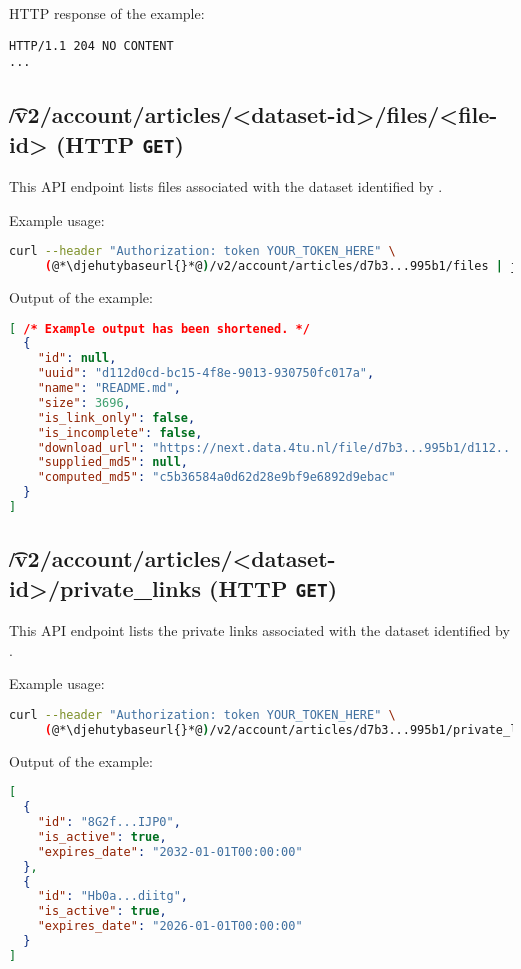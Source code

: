   HTTP response of the example:
\begin{lstlisting}
HTTP/1.1 204 NO CONTENT
...
\end{lstlisting}

\subsection{\t{/v2/account/articles/<dataset-id>/files/<file-id>} (HTTP \texttt{GET})}

  This API endpoint lists files associated with the dataset identified by
  .

  Example usage:
\begin{lstlisting}[language=bash]
curl --header "Authorization: token YOUR_TOKEN_HERE" \
     (@*\djehutybaseurl{}*@)/v2/account/articles/d7b3...995b1/files | jq
\end{lstlisting}

  Output of the example:
\begin{lstlisting}[language=JSON]
[ /* Example output has been shortened. */
  {
    "id": null,
    "uuid": "d112d0cd-bc15-4f8e-9013-930750fc017a",
    "name": "README.md",
    "size": 3696,
    "is_link_only": false,
    "is_incomplete": false,
    "download_url": "https://next.data.4tu.nl/file/d7b3...995b1/d112...c017a",
    "supplied_md5": null,
    "computed_md5": "c5b36584a0d62d28e9bf9e6892d9ebac"
  }
]
\end{lstlisting}

\subsection{\t{/v2/account/articles/<dataset-id>/private\_links} (HTTP \texttt{GET})}

  This API endpoint lists the private links associated with the dataset
  identified by \code{dataset-id}.

  Example usage:
\begin{lstlisting}[language=bash]
curl --header "Authorization: token YOUR_TOKEN_HERE" \
     (@*\djehutybaseurl{}*@)/v2/account/articles/d7b3...995b1/private_links | jq
\end{lstlisting}

  Output of the example:
\begin{lstlisting}[language=JSON]
[
  {
    "id": "8G2f...IJP0",
    "is_active": true,
    "expires_date": "2032-01-01T00:00:00"
  },
  {
    "id": "Hb0a...diitg",
    "is_active": true,
    "expires_date": "2026-01-01T00:00:00"
  }
]
\end{lstlisting}

